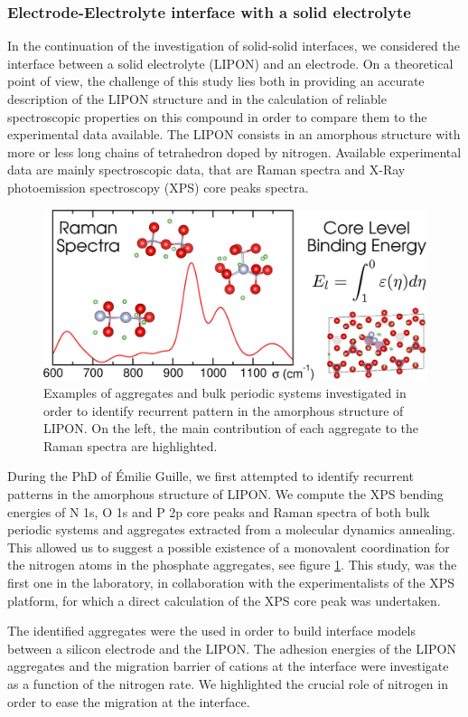 \documentclass[11pt]{artuppax}
\newcounter{subsec}[section]
\begin{document}
\subsubsection{Electrode-Electrolyte interface with a solid electrolyte}

In the continuation of the investigation of solid-solid interfaces, we considered the interface
between a solid electrolyte  (LIPON) and an electrode. On a theoretical point of
view, the challenge of this study lies both in providing an accurate description of the LIPON structure
and in the calculation of reliable spectroscopic properties on this compound in order to compare them
to the experimental data available. The LIPON consists in an amorphous structure with more or
less long chains of  tetrahedron doped by nitrogen. Available experimental data are
mainly spectroscopic data, that are Raman spectra and X-Ray photoemission spectroscopy (XPS) core peaks
spectra.

\begin{figure}[h]
    \centering
    \includegraphics[width=.6\textwidth]{img/lipon}
    \caption{Examples of aggregates and bulk periodic systems investigated in order to identify recurrent
    pattern in the amorphous structure of LIPON. On the left, the main contribution of each aggregate
    to the Raman spectra are highlighted.}
    \label{fig:lipon}
\end{figure}

During the PhD of Émilie Guille, we first attempted to identify recurrent patterns in the amorphous
structure of LIPON. We compute the XPS bending energies of N 1s, O 1s and P 2p core peaks
and Raman spectra of both bulk periodic systems and aggregates extracted from a molecular dynamics
annealing. This allowed us to suggest a possible existence of a monovalent coordination for the nitrogen
atoms in the phosphate aggregates, see figure \ref{fig:lipon}. This study, was the first one in the
laboratory, in collaboration with the experimentalists of the XPS platform, for which a direct
calculation of the XPS core peak was undertaken.

The identified aggregates were the used in order to build interface models between a silicon electrode and
the LIPON. The adhesion energies of the LIPON aggregates and the migration barrier of  cations
at the interface were investigate as a function of the nitrogen rate. We highlighted the crucial role
of nitrogen in order to ease the migration at the interface.
\end{document}
